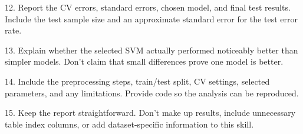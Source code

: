 12. Report the CV errors, standard errors, chosen model, and final test results. Include the test sample size and an approximate standard error for the test error rate.\par
13. Explain whether the selected SVM actually performed noticeably better than simpler models. Don't claim that small differences prove one model is better.\par
14. Include the preprocessing steps, train/test split, CV settings, selected parameters, and any limitations. Provide code so the analysis can be reproduced.\par
15. Keep the report straightforward. Don't make up results, include unnecessary table index columns, or add dataset-specific information to this skill.\par
\endgroup
